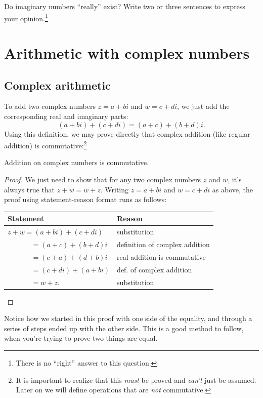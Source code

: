 \begin{exercise}\label{exercise:complex:7} Do imaginary numbers ``really'' exist? Write
two or three sentences to express your opinion.\footnote{There is no ``right'' answer to this question.}
\end{exercise}


\section{Arithmetic with complex numbers}\label{complex_arith}
\subsection{Complex arithmetic}

To add two complex numbers $z=a+bi$ and $w=c+di$, we just add the
corresponding real and imaginary parts: 
\[(a+bi)+(c+di)=(a+c)+(b+d)i.\]
Using this definition, we may prove directly that complex addition (like regular addition) is commutative:\footnote{It is important to realize that this \emph{must} be proved and \emph{can't} just be assumed.  Later on we will define operations that are \emph{not} commutative.}

\begin{prop}\label{proposition:complex:complex_comm}
Addition on complex numbers is commutative.
\end{prop}
\begin{proof}
We just need to show that for any two complex numbers $z$ and $w$, it's always true that $z + w = w + z$.  Writing $z = a + bi$ and $w = c + di$ as above, the proof using statement-reason format runs as follows:

\begin{tabular}{l| l}
Statement& Reason\\
\hline
$z + w = (a + bi) + (c + di)$ &substitution\\
~~~~~~ $= (a + c) + (b + d)i$ & definition of complex addition\\
~~~~~~ $= (c + a) + (d + b)i$ & real addition is commutative\\
~~~~~~ $= (c + di) + (a + bi)$ & def. of complex addition\\
~~~~~~ $= w + z$. & substitution\\
\end{tabular}
\end{proof}

Notice how we started in this proof with one side of the equality, and through a series of steps ended up with the other side. This is a good method to follow, when you're trying to prove two things are equal.


